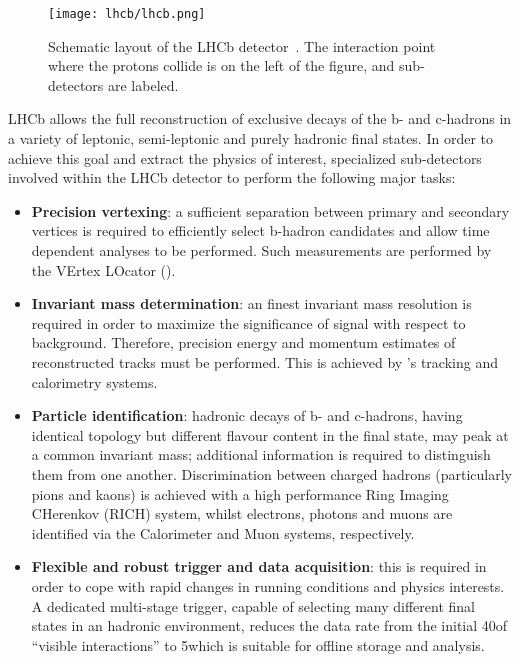 \begin{figure}[tb]
\begin{center}
\texttt{[image: lhcb/lhcb.png]}
\end{center}
\caption{\small Schematic layout of the LHCb detector~\cite{Alves:2008zz}. 
The interaction point where the protons collide is on the left of the figure, 
and sub-detectors are labeled.}
\label{fig:lhcb}
\end{figure}

LHCb allows the full reconstruction of exclusive decays of the b- and c-hadrons
in a variety of leptonic, semi-leptonic and purely hadronic final states. 
In order to achieve this goal and extract the physics of interest, 
specialized sub-detectors involved within the LHCb detector to perform the 
following major tasks:

\begin{itemize}

\item {\bf Precision vertexing}: a sufficient separation between primary and 
secondary vertices is required to efficiently select b-hadron candidates 
and allow time dependent analyses to be performed. Such measurements are 
performed by the VErtex LOcator (\velo).

\item {\bf Invariant mass determination}: an finest invariant mass
resolution is required in order to maximize the significance of signal with
respect to background. Therefore, precision energy and momentum estimates of
reconstructed tracks must be performed. This is achieved by \lhcb’s tracking
and calorimetry systems.

\item {\bf Particle identification}: hadronic decays of b- and c-hadrons, 
having identical topology but different flavour content in the final state, 
may peak at a common invariant mass; additional information is required to 
distinguish them from one another. 
Discrimination between charged hadrons (particularly pions and kaons) is 
achieved with a high performance Ring Imaging CHerenkov (RICH) system, 
whilst electrons, photons and muons are identified via the 
Calorimeter and Muon systems, respectively.

\item {\bf Flexible and robust trigger and data acquisition}: this is required 
in order to cope with rapid changes in running conditions and physics 
interests. A dedicated multi-stage trigger, capable of selecting many different 
final states in an hadronic environment, reduces the data rate from the initial 
40\mhz of ``visible interactions'' to 5\khz which is suitable for 
offline storage and analysis.
\end{itemize}

